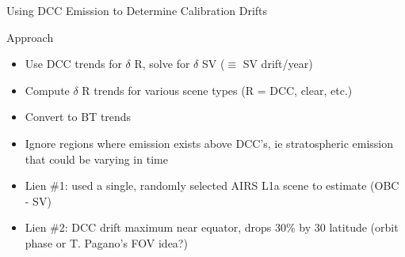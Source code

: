 \documentclass[10pt,t]{beamer}
\begin{document}
\begin{frame}[label={sec:orgd21ecfb},shrink=20]{Using DCC Emission to Determine Calibration Drifts}
\begin{block}{Approach}
\begin{itemize}
\item Use DCC trends for \(\delta\) R, solve for \(\delta\) SV (\(\equiv\) SV drift/year)
\item Compute \(\delta\) R trends for various scene types (R = DCC, clear, etc.)
\item Convert to BT trends
\item Ignore regions where emission exists above DCC's, ie stratospheric emission that could be varying in time
\item Lien \#1: used a single, randomly selected AIRS L1a scene to estimate (OBC - SV)
\item Lien \#2: DCC drift maximum near equator, drops 30\% by \textpm{} 30\textdegree{} latitude (orbit phase or T. Pagano's FOV idea?)
\end{itemize}
\end{block}
\end{frame}
\end{document}

